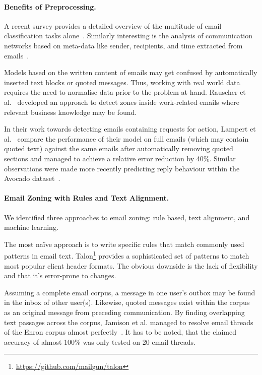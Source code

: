 \documentclass{llncs}
\begin{document}
\paragraph{Benefits of Preprocessing.}
A recent survey provides a detailed overview of the multitude of email classification tasks alone~\cite{classification}.
Similarly interesting is the analysis of communication networks based on meta-data like sender, recipients, and time extracted from emails~\cite{sna2}.

Models based on the written content of emails may get confused by automatically inserted text blocks or quoted messages.
Thus, working with real world data requires the need to normalise data prior to the problem at hand.
Rauscher et al.~\cite{rauscher2015context} developed an approach to detect zones inside work-related emails where relevant business knowledge may be found.

In their work towards detecting emails containing requests for action, Lampert et al.~\cite{rfa} compare the performance of their model on full emails (which may contain quoted text) against the same emails after automatically removing quoted sections and managed to achieve a relative error reduction by 40\%.
Similar observations were made more recently predicting reply behaviour within the Avocado dataset~\cite{replying}.

\paragraph{Email Zoning with Rules and Text Alignment.}
We identified three approaches to email zoning: rule based, text alignment, and machine learning.

The most na\"ive approach is to write specific rules that match commonly used patterns in email text.
Talon\footnote{\url{https://github.com/mailgun/talon}} provides a sophisticated set of patterns to match most popular client header formats.
The obvious downside is the lack of flexibility and that it's error-prone to changes.

Assuming a complete email corpus, a message in one user's outbox may be found in the inbox of other user(s).
Likewise, quoted messages exist within the corpus as an original message from preceding communication.
By finding overlapping text passages across the corpus, Jamison et al. managed to resolve email threads of the Enron corpus almost perfectly~\cite{headerless}.
It has to be noted, that the claimed accuracy of almost 100\% was only tested on 20 email threads.
\end{document}

